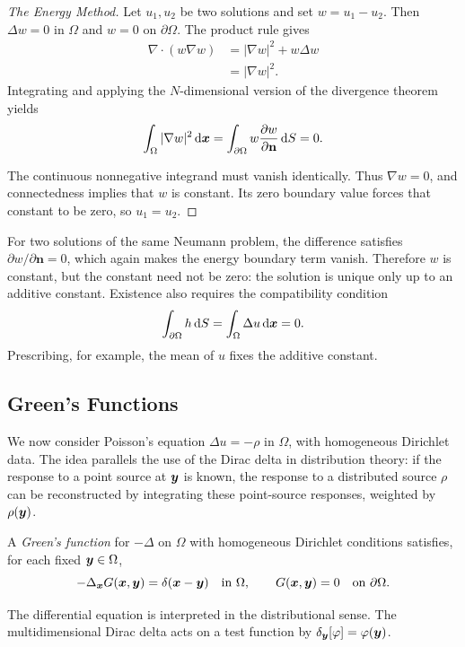 \begin{proof}[The Energy Method]
Let $u_1,u_2$ be two solutions and set $w=u_1-u_2$. Then $\Delta w=0$ in $\Omega$ and $w=0$ on $\partial\Omega$. The product rule gives
\begin{equation}
\begin{aligned}
\nabla\cdot(w\nabla w) &= |\nabla w|^2+w\Delta w \\
&= |\nabla w|^2.
\end{aligned}
\end{equation}
Integrating and applying the $N$-dimensional version of the divergence theorem yields
\begin{equation}
\int_\Omega|\nabla w|^2\,\mathrm{d}\bm{x}
=\int_{\partial\Omega}w\frac{\partial w}{\partial\mathbf{n}}\,\mathrm{d} S=0.
\end{equation}

The continuous nonnegative integrand must vanish identically. Thus $\nabla w=0$, and connectedness implies that $w$ is constant. Its zero boundary value forces that constant to be zero, so $u_1=u_2$.
\end{proof}

\begin{remark}
For two solutions of the same Neumann problem, the difference satisfies $\partial w/\partial\mathbf{n}=0$, which again makes the energy boundary term vanish. Therefore $w$ is constant, but the constant need not be zero: the solution is unique only up to an additive constant. Existence also requires the compatibility condition
\begin{equation}
\int_{\partial\Omega}h\,\mathrm{d} S=\int_\Omega\Delta u\,\mathrm{d}\bm{x}=0.
\end{equation}
Prescribing, for example, the mean of $u$ fixes the additive constant.
\end{remark}

\subsection{Green's Functions}
\label{sec:green-functions}

We now consider Poisson's equation $\Delta u=-\rho$ in $\Omega$, with homogeneous Dirichlet data. The idea parallels the use of the Dirac delta in distribution theory: if the response to a point source at $\bm{y}$ is known, the response to a distributed source $\rho$ can be reconstructed by integrating these point-source responses, weighted by $\rho(\bm{y})$.

\begin{definition}
A \emph{Green's function} for $-\Delta$ on $\Omega$ with homogeneous Dirichlet conditions satisfies, for each fixed $\bm{y}\in\Omega$,
\begin{equation}
-\Delta_{\bm{x}}G(\bm{x},\bm{y})=\delta(\bm{x}-\bm{y})\quad\text{in }\Omega,
\qquad G(\bm{x},\bm{y})=0\quad\text{on }\partial\Omega.
\end{equation}

The differential equation is interpreted in the distributional sense. The multidimensional Dirac delta acts on a test function by $\delta_{\bm{y}}[\varphi]=\varphi(\bm{y})$.
\end{definition}


